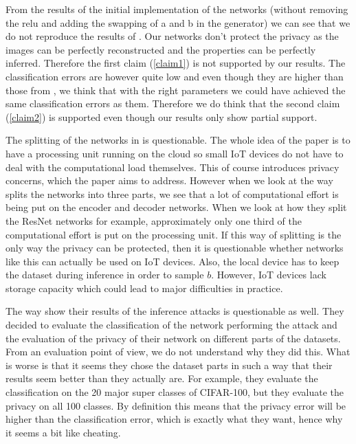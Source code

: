 From the results of the initial implementation of the networks (without removing the relu and adding the swapping of a and b in the generator) we can see that we do not reproduce the results of \cite{xiang2020interpretable}. Our networks don't protect the privacy as the images can be perfectly reconstructed and the properties can be perfectly inferred. Therefore the first claim (\ref{claim1}) is not supported by our results. The classification errors are however quite low and even though they are higher than those from \cite{xiang2020interpretable}, we think that with the right parameters we could have achieved the same classification errors as them. Therefore we do think that the second claim (\ref{claim2}) is supported even though our results only show partial support.

The splitting of the networks in \cite{xiang2020interpretable} is questionable. The whole idea of the paper is to have a processing unit running on the cloud so small IoT devices do not have to deal with the computational load themselves. This of course introduces privacy concerns, which the paper aims to address. However when we look at the way \cite{xiang2020interpretable} splits the networks into three parts, we see that a lot of computational effort is being put on the encoder and decoder networks. When we look at how they split the ResNet networks for example, approximately only one third of the computational effort is put on the processing unit. If this way of splitting is the only way the privacy can be protected, then it is questionable whether networks like this can actually be used on IoT devices. Also, the local device has to keep the dataset during inference in order to sample $b$. However, IoT devices lack storage capacity which could lead to major difficulties in practice.

The way \cite{xiang2020interpretable} show their results of the inference attacks is questionable as well. They decided to evaluate the classification of the network performing the attack and the evaluation of the privacy of their network on different parts of the datasets. From an evaluation point of view, we do not understand why they did this. What is worse is that it seems they chose the dataset parts in such a way that their results seem better than they actually are. For example, they evaluate the classification on the 20 major super classes of CIFAR-100, but they evaluate the privacy on all 100 classes. By definition this means that the privacy error will be higher than the classification error, which is exactly what they want, hence why it seems a bit like cheating.

